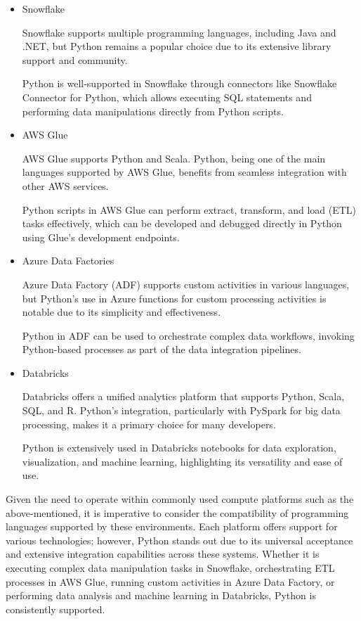 \begin{itemize}
\item  Snowflake

Snowflake supports multiple programming languages, including Java and .NET, but Python remains a popular choice due to its extensive library support and community.

Python is well-supported in Snowflake through connectors like Snowflake Connector for Python, which allows executing SQL statements and performing data manipulations directly from Python scripts.


\item AWS Glue

    AWS Glue supports Python and Scala. Python, being one of the main languages supported by AWS Glue, benefits from seamless integration with other AWS services.
    
    Python scripts in AWS Glue can perform extract, transform, and load (ETL) tasks effectively, which can be developed and debugged directly in Python using Glue’s development endpoints.


    \item Azure Data Factories

    Azure Data Factory (ADF) supports custom activities in various languages, but Python’s use in Azure functions for custom processing activities is notable due to its simplicity and effectiveness.
   
    Python in ADF can be used to orchestrate complex data workflows, invoking Python-based processes as part of the data integration pipelines.


    \item Databricks

    Databricks offers a unified analytics platform that supports Python, Scala, SQL, and R. Python’s integration, particularly with PySpark for big data processing, makes it a primary choice for many developers.

    Python is extensively used in Databricks notebooks for data exploration, visualization, and machine learning, highlighting its versatility and ease of use.

\end{itemize}


Given the need to operate within commonly used compute platforms such as the above-mentioned, it is imperative to consider the compatibility of programming languages supported by these environments. Each platform offers support for various technologies; however, Python stands out due to its universal acceptance and extensive integration capabilities across these systems. Whether it is executing complex data manipulation tasks in Snowflake, orchestrating ETL processes in AWS Glue, running custom activities in Azure Data Factory, or performing data analysis and machine learning in Databricks, Python is consistently supported. 

